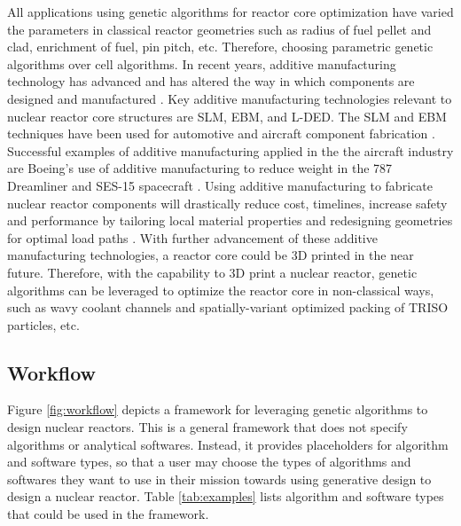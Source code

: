 All applications using genetic algorithms for reactor core optimization 
have varied the parameters in classical reactor geometries such as radius of 
fuel pellet and clad, enrichment of fuel, pin pitch, etc. 
Therefore, choosing parametric genetic algorithms over cell algorithms. 
In recent years, additive manufacturing technology has advanced and has altered 
the way in which components are designed and manufactured 
\cite{simpson_considerations_2019}. 
Key additive manufacturing technologies relevant to nuclear reactor 
core structures are \gls{SLM}, \gls{EBM}, and \gls{L-DED}.
The \gls{SLM} and \gls{EBM} techniques have been used for 
automotive and aircraft component fabrication \cite{murr_frontiers_2016}. 
Successful examples of additive manufacturing applied in the the aircraft industry
are Boeing's use of additive manufacturing to reduce weight in the 787 Dreamliner
\cite{noauthor_printed_2017} and SES-15 spacecraft \cite{noauthor_boeing_nodate}. 
Using additive manufacturing to fabricate nuclear reactor components will 
drastically reduce cost, timelines, increase safety and performance by tailoring 
local material properties and redesigning geometries for optimal load paths 
\cite{simpson_considerations_2019}. 
With further advancement of these additive manufacturing technologies, 
a reactor core could be 3D printed in the near future. 
Therefore, with the capability to 3D print a nuclear reactor, genetic algorithms 
can be leveraged to optimize the reactor core in non-classical ways, such as wavy
coolant channels and spatially-variant optimized packing of \gls{TRISO} particles, 
etc.  


\subsection{Workflow}
Figure \ref{fig:workflow} depicts a framework for leveraging genetic algorithms
to design nuclear reactors. 
This is a general framework that does not specify algorithms or analytical 
softwares. 
Instead, it provides placeholders for algorithm and software types, so 
that a user may choose the types of algorithms and softwares they want to use in 
their mission towards using generative design to design a nuclear reactor. 
Table \ref{tab:examples} lists algorithm and software types that could be used 
in the framework. 

